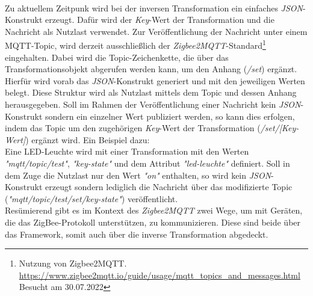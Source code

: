     \\
    \linebreak
    Zu aktuellem Zeitpunk wird bei der inversen Transformation ein einfaches \textit{JSON}-Konstrukt erzeugt. Dafür wird der 
    \textit{Key}-Wert der Transformation und die Nachricht als Nutzlast verwendet. Zur Veröffentlichung der Nachricht unter einem 
    \acs{MQTT}-Topic, wird derzeit ausschließlich der \textit{Zigbee2MQTT}-Standard\footnote{Nutzung von Zigbee2MQTT. \url{https://www.zigbee2mqtt.io/guide/usage/mqtt_topics_and_messages.html} Besucht am 30.07.2022} 
    eingehalten. Dabei wird die Topic-Zeichenkette, die über das Transformationsobjekt abgerufen werden kann, um den Anhang (\textit{/set}) ergänzt. 
    Hierfür wird vorab das \textit{JSON}-Konstrukt generiert und mit den jeweiligen Werten belegt. Diese Struktur wird als Nutzlast mittels dem 
    Topic und dessen Anhang herausgegeben. Soll im Rahmen der Veröffentlichung einer Nachricht kein \textit{JSON}-Konstrukt sondern ein einzelner Wert 
    publiziert werden, so kann dies erfolgen, indem das Topic um den zugehörigen \textit{Key}-Wert der Transformation (\textit{/set/[Key-Wert]}) ergänzt wird. Ein Beispiel dazu:
    \\
    Eine LED-Leuchte wird mit einer Transformation mit den Werten \textit{"mqtt/topic/test"}, \textit{"key-state"} und dem Attribut \textit{"led-leuchte"} 
    definiert. Soll in dem Zuge die Nutzlast nur den Wert \textit{"on"} enthalten, so wird kein 
    \textit{JSON}-Konstrukt erzeugt sondern lediglich die Nachricht über das modifizierte Topic (\textit{"mqtt/topic/test/set/key-state"}) veröffentlicht. 
    \\
    \linebreak
    Resümierend gibt es im Kontext des \textit{Zigbee2MQTT} zwei Wege, um mit Geräten, die das ZigBee-Protokoll unterstützen, zu kommunizieren. Diese sind beide 
    über das Framework, somit auch über die inverse Transformation abgedeckt.

%

